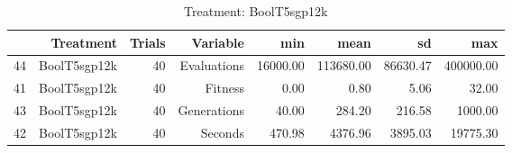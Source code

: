 \begin{table}[ht]
\centering
\begin{tabular}{rrrrrrrr}
  \hline
 & Treatment & Trials & Variable & min & mean & sd & max \\ 
  \hline
44 & BoolT5sgp12k &  40 & Evaluations & 16000.00 & 113680.00 & 86630.47 & 400000.00 \\ 
  41 & BoolT5sgp12k &  40 & Fitness & 0.00 & 0.80 & 5.06 & 32.00 \\ 
  43 & BoolT5sgp12k &  40 & Generations & 40.00 & 284.20 & 216.58 & 1000.00 \\ 
  42 & BoolT5sgp12k &  40 & Seconds & 470.98 & 4376.96 & 3895.03 & 19775.30 \\ 
   \hline
\end{tabular}
\caption{Treatment: BoolT5sgp12k} 
\end{table}
